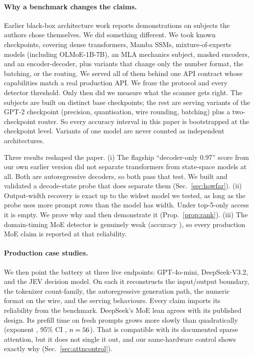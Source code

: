 \paragraph{Why a benchmark changes the claims.}
Earlier black-box architecture work reports demonstrations on subjects the authors chose
themselves.  We did something different.  We took \BenchN{} known checkpoints, covering
dense transformers, Mamba SSMs, mixture-of-experts models (including OLMoE-1B-7B), an MLA
mechanics subject, masked encoders, and an encoder-decoder, plus variants that change
only the number format, the batching, or the routing.  We served all of them behind one
API contract whose capabilities match a real production API.  We froze the protocol and
every detector threshold.  Only then did we measure what the scanner gets right.  The
\BenchN{} subjects are built on \BenchArchs{} distinct base checkpoints; the rest are
serving variants of the GPT-2 checkpoint (precision, quantisation, wire rounding,
batching) plus a two-checkpoint router.  So every accuracy interval in this paper is
bootstrapped at the checkpoint level.  Variants of one model are never counted as
independent architectures.

Three results reshaped the paper.  (i) The flagship ``decoder-only 0.97'' score from our
own earlier version did not separate transformers from state-space models at all.  Both
are autoregressive decoders, so both pass that test.  We built and validated a
decode-state probe that does separate them (Sec.~\ref{sec:howfar}).  (ii) Output-width
recovery is exact up to the widest model we tested, as long as the probe uses more prompt
rows than the model has width.  Under top-5-only access it is empty.  We prove why and
then demonstrate it (Prop.~\ref{prop:rank}).  (iii) The domain-timing MoE detector is
genuinely weak (accuracy \MoeAcc), so every production MoE claim is reported at that
reliability.

\paragraph{Production case studies.}
We then point the battery at three live endpoints: GPT-4o-mini, DeepSeek-V3.2, and the
JEV decision model.  On each it reconstructs the input/output boundary, the tokenizer
count-family, the autoregressive generation path, the numeric format on the wire, and the
serving behaviours.  Every claim imports its reliability from the benchmark.  DeepSeek's
MoE lean agrees with its published design.  Its prefill time on fresh prompts grows more
slowly than quadratically (exponent \DsFreshExp, 95\% CI \DsFreshCI, $n=56$).
That is compatible with its documented sparse attention, but it does not single it out,
and our same-hardware control shows exactly why (Sec.~\ref{sec:attncontrol}).

